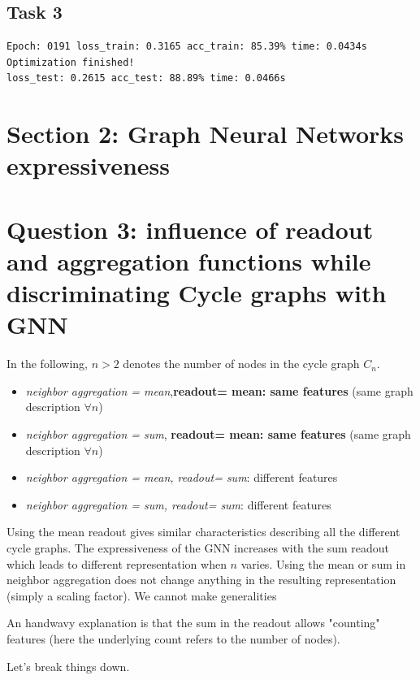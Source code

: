 \documentclass[a4paper]{article}
\begin{document}
\subsection*{Task 3}
\begin{verbatim}
Epoch: 0191 loss_train: 0.3165 acc_train: 85.39% time: 0.0434s
Optimization finished!
loss_test: 0.2615 acc_test: 88.89% time: 0.0466s
\end{verbatim}


\section*{Section 2: Graph Neural Networks expressiveness}
\section*{Question 3: influence of readout and aggregation functions while discriminating Cycle graphs with GNN}
In the following, $n > 2$ denotes the number of nodes in the cycle graph $C_{n}$.
\begin{itemize}
    \item \textit{neighbor aggregation = mean},\textbf{readout= mean: same features} (same graph description $\forall{n}$)
    \item \textit{neighbor aggregation = sum}, \textbf{readout= mean: same features} (same graph description $\forall{n}$)
    \item \textit{neighbor aggregation = mean, readout= sum}: different features
    \item \textit{neighbor aggregation = sum, readout= sum}: different features
\end{itemize}



Using the mean readout gives similar characteristics describing all the different cycle graphs.
The expressiveness of the GNN increases with the sum readout which leads to different representation when $n$ varies.
Using the mean or sum in neighbor aggregation does not change anything in the resulting representation (simply a scaling factor). We cannot make generalities

An handwavy explanation is that the sum in the readout allows "counting" features (here the underlying count refers to the number of nodes).

Let's break things down.
\end{document}
